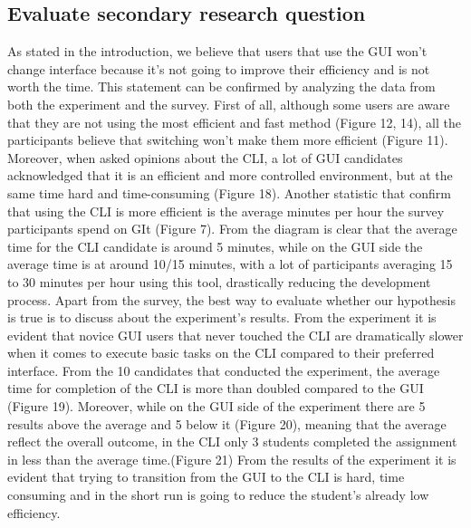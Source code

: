 \documentclass[]{report}
\begin{document}
	\subsection{Evaluate secondary research question}
	As stated in the introduction, we believe that users that use the GUI won't change interface because it's not going to improve their efficiency and is not worth the time.
	This statement can be confirmed by analyzing the data from both the experiment and the survey.
	First of all, although some users are aware that they are not using the most efficient and fast method (Figure 12, 14), all the participants believe that switching won't make them more efficient (Figure 11).
	Moreover, when asked opinions about the CLI, a lot of GUI candidates acknowledged that it is an efficient and more controlled environment, but at the same time hard and time-consuming (Figure 18).
	Another statistic that confirm that using the CLI is more efficient is the average minutes per hour the survey participants spend on GIt (Figure 7). From the diagram is clear that the average time for the CLI candidate is around 5 minutes, while on the GUI side the average time is at around 10/15 minutes, with a lot of participants averaging 15 to 30 minutes per hour using this tool, drastically reducing the development process.
	Apart from the survey, the best way to evaluate whether our hypothesis is true is to discuss about the experiment's results.
	From the experiment it is evident that novice GUI users that never touched the CLI are dramatically slower when it comes to execute basic tasks on the CLI compared to their preferred interface.
	From the 10 candidates that conducted the experiment, the average time for completion of the CLI is more than doubled compared to the GUI (Figure 19). Moreover, while on the GUI side of the experiment there are 5 results above the average and 5 below it (Figure 20), meaning that the average reflect the overall outcome, in the CLI only 3 students completed the assignment in less than the average time.(Figure 21) From the results of the experiment it is evident that trying to transition from the GUI to the CLI is hard, time consuming and in the short run is going to reduce the student's already low efficiency.
	
\end{document}
